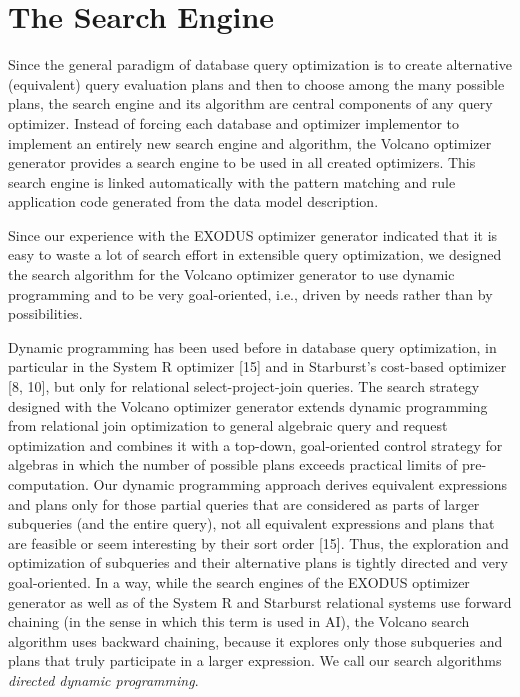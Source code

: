 \documentclass[a4paper,12pt,notitlepage,twoside,openright]{article}
\begin{document}
\hypertarget{the-search-engine}{%
\section{The Search Engine}\label{the-search-engine}}

Since the general paradigm of database query optimization is to create
alternative (equivalent) query evaluation plans and then to choose among
the many possible plans, the search engine and its algorithm are central
components of any query optimizer. Instead of forcing each database and
optimizer implementor to implement an entirely new search engine and
algorithm, the Volcano optimizer generator provides a search engine to
be used in all created optimizers. This search engine is linked
automatically with the pattern matching and rule application code
generated from the data model description.

Since our experience with the EXODUS optimizer generator indicated that
it is easy to waste a lot of search effort in extensible query
optimization, we designed the search algorithm for the Volcano optimizer
generator to use dynamic programming and to be very goal-oriented, i.e.,
driven by needs rather than by possibilities.

Dynamic programming has been used
before in database query optimization, in particular in the System R
optimizer {[}15{]} and in Starburst's cost-based optimizer {[}8, 10{]},
but only for relational select-project-join queries. The search strategy
designed with the Volcano optimizer generator extends dynamic
programming from relational join optimization to general algebraic query
and request optimization and combines it with a top-down, goal-oriented
control strategy for algebras in which the number of possible plans
exceeds practical limits of pre-computation. Our dynamic programming
approach derives equivalent expressions and plans only for those partial
queries that are considered as parts of larger subqueries (and the
entire query), not all equivalent expressions and plans that are
feasible or seem interesting by their sort order {[}15{]}. Thus, the
exploration and optimization of subqueries and their alternative plans
is tightly directed and very goal-oriented. In a way, while the search
engines of the EXODUS optimizer generator as well as of the System R and
Starburst relational systems use forward chaining (in the sense in which
this term is used in AI), the Volcano search algorithm uses backward
chaining, because it explores only those subqueries and plans that truly
participate in a larger expression. We call our search algorithms
\emph{directed dynamic programming}.
\end{document}
